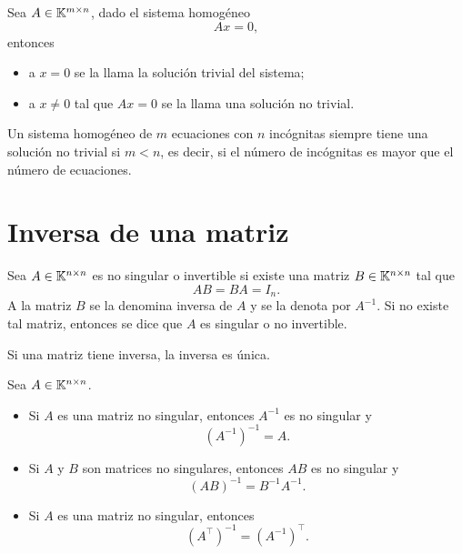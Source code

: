 \documentclass[a4,11pt]{aleph-notas}
\begin{document}
\begin{defi}
    Sea $A\in \Mat[\K]{m}{n}$, dado el sistema homogéneo
    \[ 
        Ax = 0,
    \]
    entonces
    \begin{itemize}
    \item 
        a $x = 0$ se la llama la solución trivial del sistema;
    \item 
        a $x \neq 0$ tal que $Ax=0$ se la llama una solución no trivial. 
    \end{itemize}
\end{defi}

\begin{teo}
    Un sistema homogéneo de $m$ ecuaciones con $n$ incógnitas siempre tiene una solución no trivial si $m<n$, es decir, si el número de incógnitas es mayor que el número de ecuaciones. 
\end{teo}

\section{Inversa de una matriz}

\begin{defi}
    Sea $A\in \Mat[\K]{n}{n}$ es no singular o invertible si existe una matriz $B\in \Mat[\K]{n}{n}$ tal que 
    \[
        AB = BA = I_n.
    \]
    A la matriz $B$ se la denomina inversa de $A$ y se la denota por $A^{-1}$. Si no existe tal matriz, entonces se dice que $A$ es singular o no invertible. 
\end{defi}

\begin{teo}
    Si una matriz tiene inversa, la inversa es única. 
\end{teo}

\begin{teo}
    Sea $A\in \Mat[\K]{n}{n}$. 
    \begin{itemize}
    \item 
        Si $A$ es una matriz no singular, entonces $A^{-1}$ es no singular y 
        \[ 
            (A^{-1})^{-1} = A.
        \]
    \item 
        Si $A$ y $B$ son matrices no singulares, entonces $AB$ es no singular y 
        \[ 
            (AB)^{-1} = B^{-1}A^{-1}.
        \]
    \item 
        Si $A$ es una matriz no singular, entonces
        \[
            {(A^\intercal)}^{-1} = {(A^{-1})}^\intercal.
        \]
    \end{itemize}
\end{teo}
\end{document}
